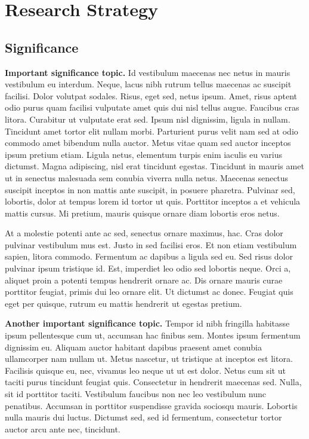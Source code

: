 \documentclass[11pt,]{article}
\title{}
\author{}
\date{}
\begin{document}
\hypertarget{research-strategy}{%
\section{Research Strategy}\label{research-strategy}}

\hypertarget{significance}{%
\subsection{Significance}\label{significance}}

\textbf{Important significance topic.} Id vestibulum maecenas nec netus
in mauris vestibulum eu interdum. Neque, lacus nibh rutrum tellus
maecenas ac suscipit facilisi. Dolor volutpat sodales. Risus, eget sed,
netus ipsum. Amet, risus aptent odio purus quam facilisi vulputate amet
quis dui nisl tellus augue. Faucibus cras litora. Curabitur ut vulputate
erat sed. Ipsum nisl dignissim, ligula in nullam. Tincidunt amet tortor
elit nullam morbi. Parturient purus velit nam sed at odio commodo amet
bibendum nulla auctor. Metus vitae quam sed auctor inceptos ipsum
pretium etiam. Ligula netus, elementum turpis enim iaculis eu varius
dictumst. Magna adipiscing, nisl erat tincidunt egestas. Tincidunt in
mauris amet ut in senectus malesuada sem conubia viverra nulla netus.
Maecenas senectus suscipit inceptos in non mattis ante suscipit, in
posuere pharetra. Pulvinar sed, lobortis, dolor at tempus lorem id
tortor ut quis. Porttitor inceptos a et vehicula mattis cursus. Mi
pretium, mauris quisque ornare diam lobortis eros netus.

At a molestie potenti ante ac sed, senectus ornare maximus, hac. Cras
dolor pulvinar vestibulum mus est. Justo in sed facilisi eros. Et non
etiam vestibulum sapien, litora commodo. Fermentum ac dapibus a ligula
sed eu. Sed risus dolor pulvinar ipsum tristique id. Est, imperdiet leo
odio sed lobortis neque. Orci a, aliquet proin a potenti tempus
hendrerit ornare ac. Dis ornare mauris curae porttitor feugiat, primis
dui leo ornare elit. Ut dictumst ac donec. Feugiat quis eget per
quisque, rutrum eu mattis hendrerit ut egestas pretium.

\textbf{Another important significance topic.} Tempor id nibh fringilla
habitasse ipsum pellentesque cum ut, accumsan hac finibus sem. Montes
ipsum fermentum dignissim eu. Aliquam auctor habitant dapibus praesent
amet conubia ullamcorper nam nullam ut. Metus nascetur, ut tristique at
inceptos est litora. Facilisis quisque eu, nec, vivamus leo neque ut ut
est dolor. Netus cum sit ut taciti purus tincidunt feugiat quis.
Consectetur in hendrerit maecenas sed. Nulla, sit id porttitor taciti.
Vestibulum faucibus non nec leo vestibulum nunc penatibus. Accumsan in
porttitor suspendisse gravida sociosqu mauris. Lobortis nulla mauris dui
luctus. Dictumst sed, sed id fermentum, consectetur tortor auctor arcu
ante nec, tincidunt.
\end{document}
